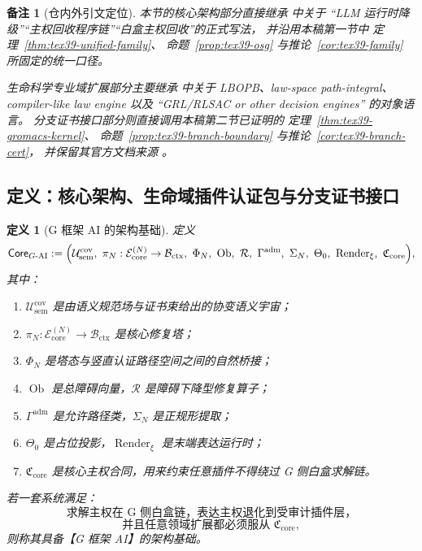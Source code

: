 \documentclass[12pt]{article}
\newtheorem{definition}{定义}[section]
\newtheorem{remark}{备注}[section]
\newcommand{\Ob}{\operatorname{Ob}}
\begin{document}
\begin{CJK*}{UTF8}{gkai}
\begin{remark}[仓内外引文定位]
本节的核心架构部分直接继承
\cite{RepoTex37SemanticGaugeRuntime}
中关于
“LLM 运行时降级”“主权回收程序链”“白盒主权回收”的正式写法，
并沿用本稿第一节中
定理~\ref{thm:tex39-unified-family}、
命题~\ref{prop:tex39-osg}
与推论~\ref{cor:tex39-family}
所固定的统一口径。

生命科学专业域扩展部分主要继承
\cite{GaoZhengAppVol2,RepoTex22Vol2InverseDesign}
中关于 LBOPB、law-space path-integral、
compiler-like law engine 以及
“GRL/RLSAC or other decision engines”
的对象语言。
分支证书接口部分则直接调用本稿第二节已证明的
定理~\ref{thm:tex39-gromacs-kernel}、
命题~\ref{prop:tex39-branch-boundary}
与推论~\ref{cor:tex39-branch-cert}，
并保留其官方文档来源
\cite{Gromacs2026ReleaseNotes,Gromacs2026Downloads,Gromacs2026Preface,Gromacs2026InstallGuide,Gromacs2026Grompp,
  Gromacs2026Mdrun,Gromacs2026Dump,Gromacs2026CP2K,Gromacs2026MiMiC,Gromacs2026NNPot,Gromacs2026Validation,
  Gromacs2026Gmxapi,Gromacs2026NBLIB}。
\end{remark}

\subsection{定义：核心架构、生命域插件认证包与分支证书接口}
\label{subsec:tex39-ch3-definitions}

\begin{definition}[G 框架 AI 的架构基础]
\label{def:tex39-ch3-core}
定义
\[
  \mathsf{Core}_{G\text{-AI}}
  :=
  \Bigl(
    \mathcal U_{\mathrm{sem}}^{\mathrm{cov}},
    \ \pi_N:\mathcal E_{\mathrm{core}}^{(N)}\to\mathcal B_{\mathrm{ctx}},
    \ \Phi_N,
    \ \Ob,
    \ \mathcal R,
    \ \Gamma^{\mathrm{adm}},
    \ \Sigma_N,
    \ \Theta_0,
    \ \operatorname{Render}_{\xi},
    \ \mathfrak C_{\mathrm{core}}
  \Bigr),
\]
其中：
\begin{enumerate}
  \item $\mathcal U_{\mathrm{sem}}^{\mathrm{cov}}$ 是由语义规范场与证书束给出的协变语义宇宙；
  \item $\pi_N:\mathcal E_{\mathrm{core}}^{(N)}\to\mathcal B_{\mathrm{ctx}}$ 是核心修复塔；
  \item $\Phi_N$ 是塔态与竖直认证路径空间之间的自然桥接；
  \item $\Ob$ 是总障碍向量，$\mathcal R$ 是障碍下降型修复算子；
  \item $\Gamma^{\mathrm{adm}}$ 是允许路径类，$\Sigma_N$ 是正规形提取；
  \item $\Theta_0$ 是占位投影，$\operatorname{Render}_{\xi}$ 是末端表达运行时；
  \item $\mathfrak C_{\mathrm{core}}$ 是核心主权合同，用来约束任意插件不得绕过
  G 侧白盒求解链。
\end{enumerate}
若一套系统满足：
\[
  \text{求解主权在 G 侧白盒链，表达主权退化到受审计插件层，}
\]
\[
  \text{并且任意领域扩展都必须服从 }\mathfrak C_{\mathrm{core}},
\]
则称其具备【G 框架 AI】的架构基础。
\end{definition}


\end{CJK*}
\end{document}
